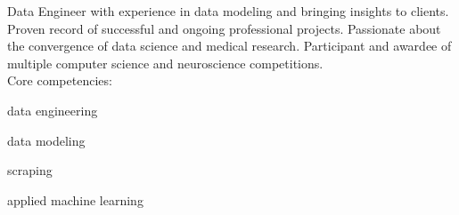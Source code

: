 \documentclass[letter,10pt]{article}
\begin{document}
Data Engineer with experience in data modeling and bringing insights to clients. Proven record of successful and ongoing professional projects. Passionate about the convergence of data science and medical research. Participant and awardee of multiple computer science and neuroscience competitions. \medskip\\
Core competencies:
\begin{zitemize}
\item data engineering
\item data modeling
\item scraping
\item applied machine learning
\end{zitemize}
\end{document}
